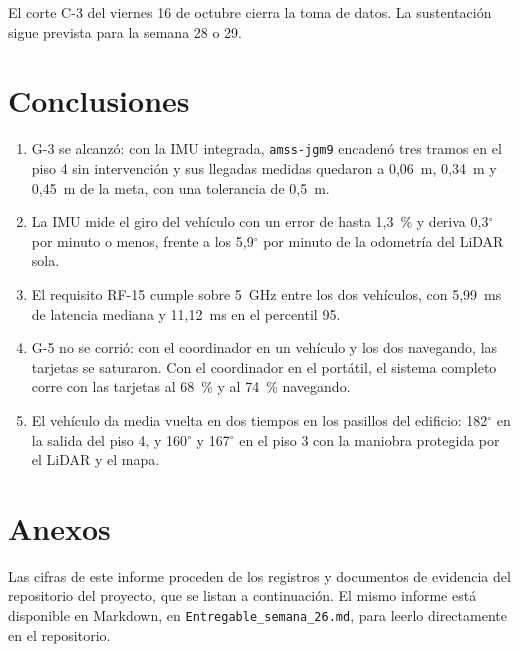 \documentclass[12pt,letterpaper]{article}
\begin{document}
El corte C-3 del viernes 16 de octubre cierra la toma de datos. La sustentación sigue prevista para la semana 28 o 29.

\section{Conclusiones}

\begin{enumerate}[leftmargin=*]
    \item G-3 se alcanzó: con la IMU integrada, \texttt{amss-jgm9} encadenó tres tramos en el piso 4 sin intervención y sus llegadas medidas quedaron a 0,06~m, 0,34~m y 0,45~m de la meta, con una tolerancia de 0,5~m.
    \item La IMU mide el giro del vehículo con un error de hasta 1,3~\% y deriva 0,3$^\circ$ por minuto o menos, frente a los 5,9$^\circ$ por minuto de la odometría del LiDAR sola.
    \item El requisito RF-15 cumple sobre 5~GHz entre los dos vehículos, con 5,99~ms de latencia mediana y 11,12~ms en el percentil 95.
    \item G-5 no se corrió: con el coordinador en un vehículo y los dos navegando, las tarjetas se saturaron. Con el coordinador en el portátil, el sistema completo corre con las tarjetas al 68~\% y al 74~\% navegando.
    \item El vehículo da media vuelta en dos tiempos en los pasillos del edificio: 182$^\circ$ en la salida del piso 4, y 160$^\circ$ y 167$^\circ$ en el piso 3 con la maniobra protegida por el LiDAR y el mapa.
\end{enumerate}

\section{Anexos}

Las cifras de este informe proceden de los registros y documentos de evidencia del repositorio del proyecto, que se listan a continuación. El mismo informe está disponible en Markdown, en \texttt{Entregable\_semana\_26.md}, para leerlo directamente en el repositorio.
\end{document}

